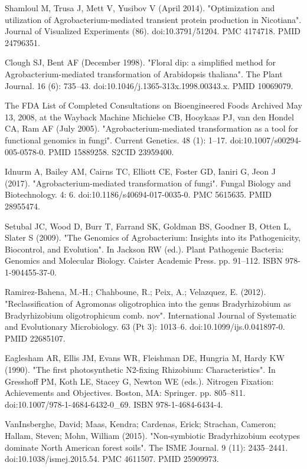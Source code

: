 \documentclass[11pt]{article}
\begin{document}
\begin{thebibliography}{3}
	 Shamloul M, Trusa J, Mett V, Yusibov V (April 2014). "Optimization and utilization of Agrobacterium-mediated transient protein production in Nicotiana". Journal of Visualized Experiments (86). doi:10.3791/51204. PMC 4174718. PMID 24796351.
	
	 Clough SJ, Bent AF (December 1998). "Floral dip: a simplified method for Agrobacterium-mediated transformation of Arabidopsis thaliana". The Plant Journal. 16 (6): 735–43. doi:10.1046/j.1365-313x.1998.00343.x. PMID 10069079.
	
	 The FDA List of Completed Consultations on Bioengineered Foods Archived May 13, 2008, at the Wayback Machine
	 Michielse CB, Hooykaas PJ, van den Hondel CA, Ram AF (July 2005). "Agrobacterium-mediated transformation as a tool for functional genomics in fungi". Current Genetics. 48 (1): 1–17. doi:10.1007/s00294-005-0578-0. PMID 15889258. S2CID 23959400.
	
	 Idnurm A, Bailey AM, Cairns TC, Elliott CE, Foster GD, Ianiri G, Jeon J (2017). "Agrobacterium-mediated transformation of fungi". Fungal Biology and Biotechnology. 4: 6. doi:10.1186/s40694-017-0035-0. PMC 5615635. PMID 28955474.
	
	Setubal JC, Wood D, Burr T, Farrand SK, Goldman BS, Goodner B, Otten L, Slater S (2009). "The Genomics of Agrobacterium: Insights into its Pathogenicity, Biocontrol, and Evolution". In Jackson RW (ed.). Plant Pathogenic Bacteria: Genomics and Molecular Biology. Caister Academic Press. pp. 91–112. ISBN 978-1-904455-37-0.
	
	 Ramirez-Bahena, M.-H.; Chahboune, R.; Peix, A.; Velazquez, E. (2012). "Reclassification of Agromonas oligotrophica into the genus Bradyrhizobium as Bradyrhizobium oligotrophicum comb. nov". International Journal of Systematic and Evolutionary Microbiology. 63 (Pt 3): 1013–6. doi:10.1099/ijs.0.041897-0. PMID 22685107.
	 
	 Eaglesham AR, Ellis JM, Evans WR, Fleishman DE, Hungria M, Hardy KW (1990). "The first photosynthetic N2-fixing Rhizobium: Characteristics". In Gresshoff PM, Koth LE, Stacey G, Newton WE (eds.). Nitrogen Fixation: Achievements and Objectives. Boston, MA: Springer. pp. 805–811. doi:10.1007/978-1-4684-6432-0\_69. ISBN 978-1-4684-6434-4.
	
	 VanInsberghe, David; Maas, Kendra; Cardenas, Erick; Strachan, Cameron; Hallam, Steven; Mohn, William (2015). "Non-symbiotic Bradyrhizobium ecotypes dominate North American forest soils". The ISME Journal. 9 (11): 2435–2441. doi:10.1038/ismej.2015.54. PMC 4611507. PMID 25909973.
	

\end{thebibliography}
\end{document}

